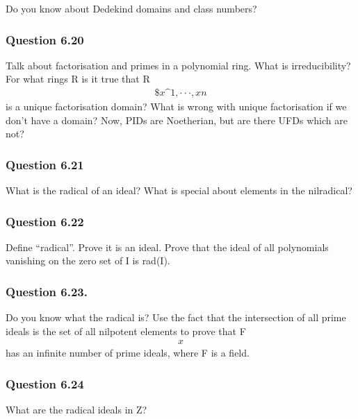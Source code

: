 Do you know about Dedekind domains and class numbers?

\hypertarget{question-6.20}{%
\subsubsection{Question 6.20}\label{question-6.20}}

Talk about factorisation and primes in a polynomial ring. What is
irreducibility? For what rings R is it true that R
\begin{align*}\$x\^1, · · · , xn\end{align*}
is a unique factorisation domain? What is wrong with unique
factorisation if we don't have a domain? Now, PIDs are Noetherian, but
are there UFDs which are not?

\hypertarget{question-6.21}{%
\subsubsection{Question 6.21}\label{question-6.21}}

What is the radical of an ideal? What is special about elements in the
nilradical?

\hypertarget{question-6.22}{%
\subsubsection{Question 6.22}\label{question-6.22}}

Define ``radical''. Prove it is an ideal. Prove that the ideal of all
polynomials vanishing on the zero set of I is rad(I).

\hypertarget{question-6.23.}{%
\subsubsection{Question 6.23.}\label{question-6.23.}}

Do you know what the radical is? Use the fact that the intersection of
all prime ideals is the set of all nilpotent elements to prove that F
\begin{align*}x\end{align*}
has an infinite number of prime ideals, where F is a field.

\hypertarget{question-6.24}{%
\subsubsection{Question 6.24}\label{question-6.24}}

What are the radical ideals in Z?

